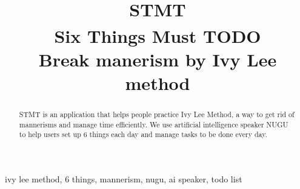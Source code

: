\documentclass[conference]{IEEEtran}
\begin{document}
\title{STMT\\
{\footnotesize \textsuperscript{}Six Things Must TODO\\
Break manerism by Ivy Lee method}}

\author{
\and
{}
\and
{}
}

\maketitle

\begin{abstract}
STMT is an application that helps people practice Ivy Lee Method, a way to get rid of mannerisms and manage time efficiently. We use artificial intelligence speaker NUGU to help users set up 6 things each day and manage tasks to be done every day.
\end{abstract}
\begin{IEEEkeywords}
ivy lee method,  6 things, mannerism, nugu, ai speaker, todo list
\end{IEEEkeywords}
\end{document}
